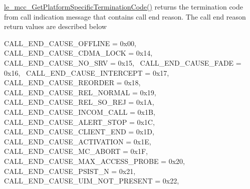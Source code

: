 \begin{DoxyItemize}
\item \hyperlink{le__mcc__interface_8h_a68b9b8ed1b221924dcea1be0fd610a54}{le\+\_\+mcc\+\_\+\+Get\+Platform\+Specific\+Termination\+Code()} returns the termination code from call indication message that contains call end reason. The call end reason return values are described below

C\+A\+L\+L\+\_\+\+E\+N\+D\+\_\+\+C\+A\+U\+S\+E\+\_\+\+O\+F\+F\+L\+I\+NE = 0x00,~\newline
 C\+A\+L\+L\+\_\+\+E\+N\+D\+\_\+\+C\+A\+U\+S\+E\+\_\+\+C\+D\+M\+A\+\_\+\+L\+O\+CK = 0x14,~\newline
 C\+A\+L\+L\+\_\+\+E\+N\+D\+\_\+\+C\+A\+U\+S\+E\+\_\+\+N\+O\+\_\+\+S\+RV = 0x15,~\newline
 C\+A\+L\+L\+\_\+\+E\+N\+D\+\_\+\+C\+A\+U\+S\+E\+\_\+\+F\+A\+DE = 0x16,~\newline
 C\+A\+L\+L\+\_\+\+E\+N\+D\+\_\+\+C\+A\+U\+S\+E\+\_\+\+I\+N\+T\+E\+R\+C\+E\+PT = 0x17,~\newline
 C\+A\+L\+L\+\_\+\+E\+N\+D\+\_\+\+C\+A\+U\+S\+E\+\_\+\+R\+E\+O\+R\+D\+ER = 0x18,~\newline
 C\+A\+L\+L\+\_\+\+E\+N\+D\+\_\+\+C\+A\+U\+S\+E\+\_\+\+R\+E\+L\+\_\+\+N\+O\+R\+M\+AL = 0x19,~\newline
 C\+A\+L\+L\+\_\+\+E\+N\+D\+\_\+\+C\+A\+U\+S\+E\+\_\+\+R\+E\+L\+\_\+\+S\+O\+\_\+\+R\+EJ = 0x1A,~\newline
 C\+A\+L\+L\+\_\+\+E\+N\+D\+\_\+\+C\+A\+U\+S\+E\+\_\+\+I\+N\+C\+O\+M\+\_\+\+C\+A\+LL = 0x1B,~\newline
 C\+A\+L\+L\+\_\+\+E\+N\+D\+\_\+\+C\+A\+U\+S\+E\+\_\+\+A\+L\+E\+R\+T\+\_\+\+S\+T\+OP = 0x1C,~\newline
 C\+A\+L\+L\+\_\+\+E\+N\+D\+\_\+\+C\+A\+U\+S\+E\+\_\+\+C\+L\+I\+E\+N\+T\+\_\+\+E\+ND = 0x1D,~\newline
 C\+A\+L\+L\+\_\+\+E\+N\+D\+\_\+\+C\+A\+U\+S\+E\+\_\+\+A\+C\+T\+I\+V\+A\+T\+I\+ON = 0x1E,~\newline
 C\+A\+L\+L\+\_\+\+E\+N\+D\+\_\+\+C\+A\+U\+S\+E\+\_\+\+M\+C\+\_\+\+A\+B\+O\+RT = 0x1F,~\newline
 C\+A\+L\+L\+\_\+\+E\+N\+D\+\_\+\+C\+A\+U\+S\+E\+\_\+\+M\+A\+X\+\_\+\+A\+C\+C\+E\+S\+S\+\_\+\+P\+R\+O\+BE = 0x20,~\newline
 C\+A\+L\+L\+\_\+\+E\+N\+D\+\_\+\+C\+A\+U\+S\+E\+\_\+\+P\+S\+I\+S\+T\+\_\+N = 0x21,~\newline
 C\+A\+L\+L\+\_\+\+E\+N\+D\+\_\+\+C\+A\+U\+S\+E\+\_\+\+U\+I\+M\+\_\+\+N\+O\+T\+\_\+\+P\+R\+E\+S\+E\+NT = 0x22,~\newline

\end{DoxyItemize}
